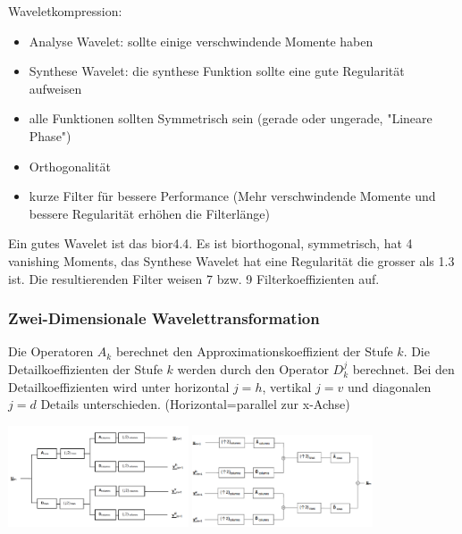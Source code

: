 Waveletkompression:
\begin{itemize}
	\item Analyse Wavelet: sollte einige verschwindende Momente haben
	\item Synthese Wavelet: die synthese Funktion sollte eine gute Regularität aufweisen
	\item alle Funktionen sollten Symmetrisch sein (gerade oder ungerade, "Lineare Phase")
	\item Orthogonalität
	\item kurze Filter für bessere Performance (Mehr verschwindende Momente und bessere Regularität erhöhen die Filterlänge)
\end{itemize}
Ein gutes Wavelet ist das bior4.4. Es ist biorthogonal, symmetrisch, hat 4 vanishing Moments, das Synthese Wavelet hat eine Regularität die grosser als 1.3 ist. Die resultierenden Filter weisen 7 bzw. 9 Filterkoeffizienten auf.


\subsubsection{Zwei-Dimensionale Wavelettransformation}

Die Operatoren $A_k$ berechnet den Approximationskoeffizient der Stufe $k$. Die Detailkoeffizienten der Stufe $k$ werden durch den Operator $D_k^j$ berechnet. Bei den Detailkoeffizienten wird unter horizontal $j=h$, vertikal $j=v$ und diagonalen $j=d$ Details unterschieden. (Horizontal=parallel zur x-Achse)

\includegraphics[width=0.4\textwidth]{content/Wavelet2DDec.pdf}	
\includegraphics[width=0.4\textwidth]{content/Wavelet2DRec.pdf}

